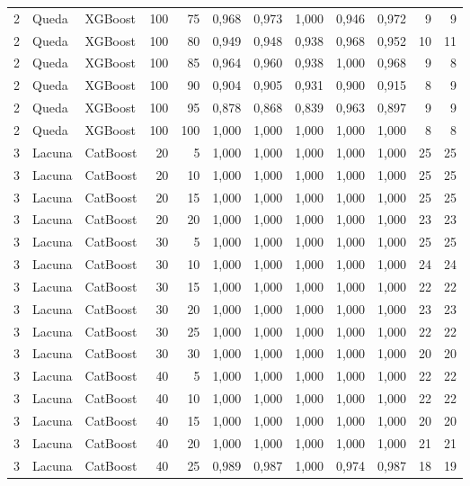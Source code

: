 \begin{longtable}{@{}rllrrrrrrrrr@{}}
2 & Queda & XGBoost & 100 & 75 & 0,968 & 0,973 & 1,000 & 0,946 & 0,972 & 9 & 9 \\
2 & Queda & XGBoost & 100 & 80 & 0,949 & 0,948 & 0,938 & 0,968 & 0,952 & 10 & 11 \\
2 & Queda & XGBoost & 100 & 85 & 0,964 & 0,960 & 0,938 & 1,000 & 0,968 & 9 & 8 \\
2 & Queda & XGBoost & 100 & 90 & 0,904 & 0,905 & 0,931 & 0,900 & 0,915 & 8 & 9 \\
2 & Queda & XGBoost & 100 & 95 & 0,878 & 0,868 & 0,839 & 0,963 & 0,897 & 9 & 9 \\
2 & Queda & XGBoost & 100 & 100 & 1,000 & 1,000 & 1,000 & 1,000 & 1,000 & 8 & 8 \\
3 & Lacuna & CatBoost & 20 & 5 & 1,000 & 1,000 & 1,000 & 1,000 & 1,000 & 25 & 25 \\
3 & Lacuna & CatBoost & 20 & 10 & 1,000 & 1,000 & 1,000 & 1,000 & 1,000 & 25 & 25 \\
3 & Lacuna & CatBoost & 20 & 15 & 1,000 & 1,000 & 1,000 & 1,000 & 1,000 & 25 & 25 \\
3 & Lacuna & CatBoost & 20 & 20 & 1,000 & 1,000 & 1,000 & 1,000 & 1,000 & 23 & 23 \\
3 & Lacuna & CatBoost & 30 & 5 & 1,000 & 1,000 & 1,000 & 1,000 & 1,000 & 25 & 25 \\
3 & Lacuna & CatBoost & 30 & 10 & 1,000 & 1,000 & 1,000 & 1,000 & 1,000 & 24 & 24 \\
3 & Lacuna & CatBoost & 30 & 15 & 1,000 & 1,000 & 1,000 & 1,000 & 1,000 & 22 & 22 \\
3 & Lacuna & CatBoost & 30 & 20 & 1,000 & 1,000 & 1,000 & 1,000 & 1,000 & 23 & 23 \\
3 & Lacuna & CatBoost & 30 & 25 & 1,000 & 1,000 & 1,000 & 1,000 & 1,000 & 22 & 22 \\
3 & Lacuna & CatBoost & 30 & 30 & 1,000 & 1,000 & 1,000 & 1,000 & 1,000 & 20 & 20 \\
3 & Lacuna & CatBoost & 40 & 5 & 1,000 & 1,000 & 1,000 & 1,000 & 1,000 & 22 & 22 \\
3 & Lacuna & CatBoost & 40 & 10 & 1,000 & 1,000 & 1,000 & 1,000 & 1,000 & 22 & 22 \\
3 & Lacuna & CatBoost & 40 & 15 & 1,000 & 1,000 & 1,000 & 1,000 & 1,000 & 20 & 20 \\
3 & Lacuna & CatBoost & 40 & 20 & 1,000 & 1,000 & 1,000 & 1,000 & 1,000 & 21 & 21 \\
3 & Lacuna & CatBoost & 40 & 25 & 0,989 & 0,987 & 1,000 & 0,974 & 0,987 & 18 & 19 \\

\end{longtable}
